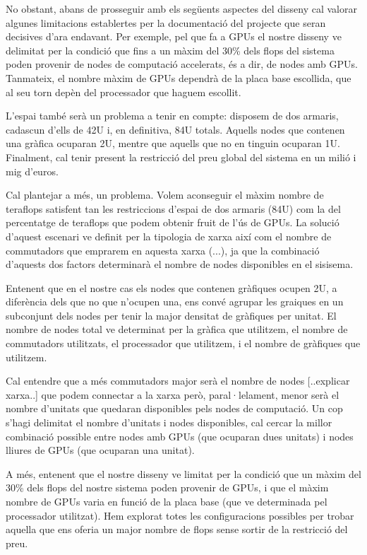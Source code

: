 No obstant, abans de prosseguir amb els següents aspectes del disseny cal valorar algunes limitacions establertes per la documentació del projecte que seran decisives d'ara endavant. Per exemple, pel que fa a GPUs el nostre disseny ve delimitat per la condició que fins a un màxim del 30\% dels flops del sistema poden provenir de nodes de computació accelerats, és a dir, de nodes amb GPUs. Tanmateix, el nombre màxim de GPUs dependrà de la placa base escollida, que al seu torn depèn del processador que haguem escollit. 

L'espai també serà un problema a tenir en compte: disposem de dos armaris, cadascun d'ells de 42U i, en definitiva, 84U totals. Aquells nodes que contenen una gràfica ocuparan 2U, mentre que aquells que no en tinguin ocuparan 1U. Finalment, cal tenir present la restricció del preu global del sistema en un milió i mig d'euros. 


Cal plantejar a més, un problema. Volem aconseguir el màxim nombre de teraflops satisfent tan les restriccions d'espai de dos armaris (84U) com la del percentatge de teraflops que podem obtenir fruit de l'ús de GPUs. La solució d'aquest escenari ve definit per la tipologia de xarxa així com el nombre de commutadors que emprarem en aquesta xarxa (...), ja que la combinació d'aquests dos factors determinarà el nombre de nodes disponibles en el sisisema.

Entenent que en el nostre cas els nodes que contenen gràfiques ocupen 2U, a diferència dels que no que n'ocupen una, ens convé agrupar les graiques en un subconjunt dels nodes per tenir la major densitat de gràfiques per unitat. El nombre de nodes total ve determinat per la gràfica que utilitzem, el nombre de commutadors utilitzats, el processador que utilitzem, i el nombre de gràfiques que utilitzem. 

Cal entendre que a més commutadors major serà el nombre de nodes [..explicar xarxa..] que podem connectar a la xarxa però, paral·lelament, menor serà el nombre d'unitats que quedaran disponibles pels nodes de computació. Un cop s'hagi delimitat el nombre d'unitats i nodes disponibles, cal cercar la millor combinació possible entre nodes amb GPUs (que ocuparan dues unitats) i nodes lliures de GPUs (que ocuparan una unitat).

A més, entenent que el nostre disseny ve limitat per la condició que un màxim del 30\% dels flops del nostre sistema poden provenir de GPUs, i que el màxim nombre de GPUs varia en funció de la placa base (que ve determinada pel processador utilitzat). Hem explorat totes les configuracions possibles per trobar aquella que ens oferia un major nombre de flops sense sortir de la restricció del preu.



